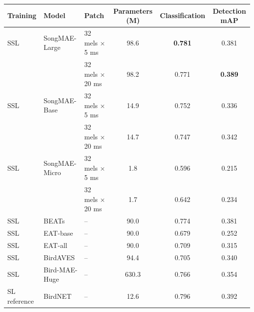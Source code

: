 \nopagebreak[4]
\vspace{0.5\baselineskip}

\label{tab:s2} %

\nopagebreak[4]
\vspace{0.5\baselineskip}

\begingroup
\setlength{\tabcolsep}{4pt}
\centering
\small
{}
\begin{tabular}{@{}lllS[table-format=3.1]S[table-format=1.3]S[table-format=1.3]@{}}
\toprule
\textbf{Training} & \textbf{Model} & \textbf{Patch} & {\textbf{Parameters (M)}} & {\textbf{Classification}} & {\textbf{Detection mAP}} \\
\midrule
SSL & SongMAE-Large & 32 mels × 5 ms & 98.6 & \textbf{0.781} & 0.381 \\
 &  & 32 mels × 20 ms & 98.2 & 0.771 & \textbf{0.389} \\
\addlinespace
SSL & SongMAE-Base & 32 mels × 5 ms & 14.9 & 0.752 & 0.336 \\
 &  & 32 mels × 20 ms & 14.7 & 0.747 & 0.342 \\
\addlinespace
SSL & SongMAE-Micro & 32 mels × 5 ms & 1.8 & 0.596 & 0.215 \\
 &  & 32 mels × 20 ms & 1.7 & 0.642 & 0.234 \\
\addlinespace
SSL & BEATs & -- & 90.0 & 0.774 & 0.381 \\
\addlinespace
SSL & EAT-base & -- & 90.0 & 0.679 & 0.252 \\
\addlinespace
SSL & EAT-all & -- & 90.0 & 0.709 & 0.315 \\
\addlinespace
SSL & BirdAVES & -- & 94.4 & 0.705 & 0.340 \\
\addlinespace
SSL & Bird-MAE-Huge & -- & 630.3 & 0.766 & 0.354 \\
\addlinespace
SL reference & BirdNET & -- & 12.6 & 0.796 & 0.392 \\
\bottomrule
\end{tabular}
\endgroup
